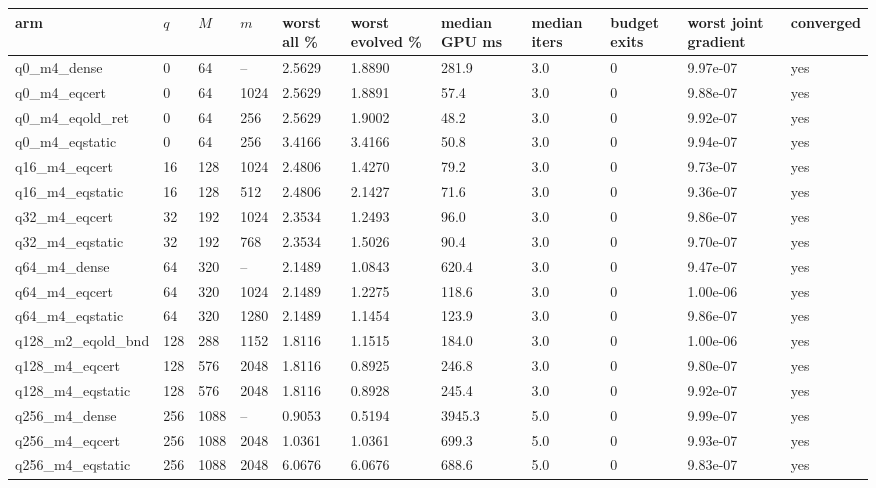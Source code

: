 \documentclass[11pt]{article}
\begin{document}
\begin{table}[htbp]\centering\small
\begin{tabular}{lllllllllll}\hline
arm & $q$ & $M$ & $m$ & worst all \% & worst evolved \% & median GPU ms & median iters & budget exits & worst joint gradient & converged \\ \hline
q0\_m4\_dense & 0 & 64 & -- & 2.5629 & 1.8890 & 281.9 & 3.0 & 0 & 9.97e-07 & yes \\
q0\_m4\_eqcert & 0 & 64 & 1024 & 2.5629 & 1.8891 & 57.4 & 3.0 & 0 & 9.88e-07 & yes \\
q0\_m4\_eqold\_ret & 0 & 64 & 256 & 2.5629 & 1.9002 & 48.2 & 3.0 & 0 & 9.92e-07 & yes \\
q0\_m4\_eqstatic & 0 & 64 & 256 & 3.4166 & 3.4166 & 50.8 & 3.0 & 0 & 9.94e-07 & yes \\
q16\_m4\_eqcert & 16 & 128 & 1024 & 2.4806 & 1.4270 & 79.2 & 3.0 & 0 & 9.73e-07 & yes \\
q16\_m4\_eqstatic & 16 & 128 & 512 & 2.4806 & 2.1427 & 71.6 & 3.0 & 0 & 9.36e-07 & yes \\
q32\_m4\_eqcert & 32 & 192 & 1024 & 2.3534 & 1.2493 & 96.0 & 3.0 & 0 & 9.86e-07 & yes \\
q32\_m4\_eqstatic & 32 & 192 & 768 & 2.3534 & 1.5026 & 90.4 & 3.0 & 0 & 9.70e-07 & yes \\
q64\_m4\_dense & 64 & 320 & -- & 2.1489 & 1.0843 & 620.4 & 3.0 & 0 & 9.47e-07 & yes \\
q64\_m4\_eqcert & 64 & 320 & 1024 & 2.1489 & 1.2275 & 118.6 & 3.0 & 0 & 1.00e-06 & yes \\
q64\_m4\_eqstatic & 64 & 320 & 1280 & 2.1489 & 1.1454 & 123.9 & 3.0 & 0 & 9.86e-07 & yes \\
q128\_m2\_eqold\_bnd & 128 & 288 & 1152 & 1.8116 & 1.1515 & 184.0 & 3.0 & 0 & 1.00e-06 & yes \\
q128\_m4\_eqcert & 128 & 576 & 2048 & 1.8116 & 0.8925 & 246.8 & 3.0 & 0 & 9.80e-07 & yes \\
q128\_m4\_eqstatic & 128 & 576 & 2048 & 1.8116 & 0.8928 & 245.4 & 3.0 & 0 & 9.92e-07 & yes \\
q256\_m4\_dense & 256 & 1088 & -- & 0.9053 & 0.5194 & 3945.3 & 5.0 & 0 & 9.99e-07 & yes \\
q256\_m4\_eqcert & 256 & 1088 & 2048 & 1.0361 & 1.0361 & 699.3 & 5.0 & 0 & 9.93e-07 & yes \\
q256\_m4\_eqstatic & 256 & 1088 & 2048 & 6.0676 & 6.0676 & 688.6 & 5.0 & 0 & 9.83e-07 & yes \\
\hline\end{tabular}
\end{table}
\end{document}
